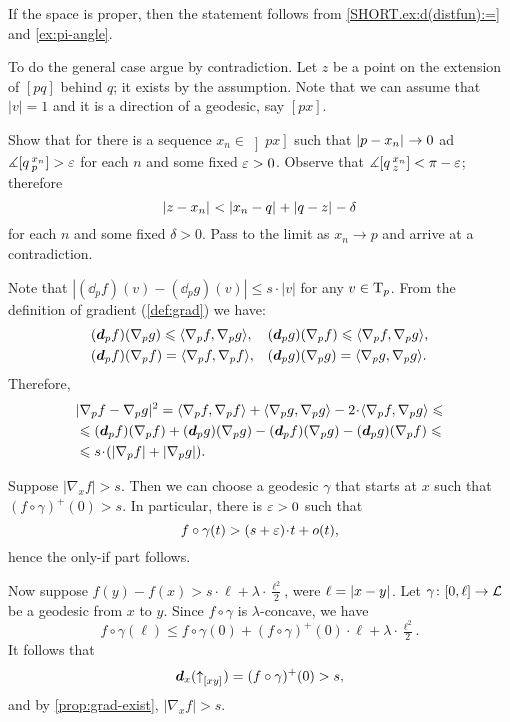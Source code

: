 If the space is proper, then the statement follows from \ref{SHORT.ex:d(distfun):=} and \ref{ex:pi-angle}.

To do the general case argue by contradiction.
Let $z$ be a point on the extension of $[pq]$ behind $q$;
it exists by the assumption.
Note that we can assume that $|v|=1$ and it is a direction of a geodesic, say $[px]$.

Show that for there is a sequence $x_n\in \left]px\right]$ such that $|{p}-{x_n}|_{}^{{}}\to0$ ad
$\measuredangle [q\,{}^{x_n}_{p}]>\varepsilon$ for each $n$ and some fixed $\varepsilon>0$.
Observe that $\measuredangle[q\,{}^{x_n}_{z}]<\pi-\varepsilon$; therefore
\[\dist{z}{x_n}{}<\dist{x_n}{q}{}+\dist{q}z{}-\delta\]
for each $n$ and some fixed $\delta>0$.
Pass to the limit as $x_n\to p$ and arrive at a contradiction.

Note that
$|(\dd_p f)(v)-(\dd_p g)(v)|\le s\cdot|v|$
for any $v\in \mathrm{T}_p$.
From the definition of gradient (\ref{def:grad}) we have:
\begin{align*}
&(\bm{d}_p f)(\nabla_p g)\leqslant\langle\nabla_p f,\nabla_p g\rangle,
&&(\bm{d}_p g)(\nabla_p f)\leqslant\langle\nabla_p f,\nabla_p g\rangle,
\\
&(\bm{d}_p f)(\nabla_p f)=\langle\nabla_p f,\nabla_p f\rangle,
&&(\bm{d}_p g)(\nabla_p g)=\langle\nabla_p g,\nabla_p g\rangle.
\end{align*}
Therefore,
\begin{align*}
&\dist[2]{\nabla_pf}{\nabla_pg}{}
=\<\nabla_p f,\nabla_p f\>+\<\nabla_p g,\nabla_p g\>-2\cdot\<\nabla_p f,\nabla_p g\>
\le
\\
&\le (\dd_p f)(\nabla_p f)+(\dd_p g)(\nabla_p g)-
(\dd_p f)(\nabla_p g)-(\dd_p g)(\nabla_p f)
\le
\\
&\le s\cdot(|\nabla_p f|+|\nabla_p g|).
\end{align*}

Suppose $|\nabla_xf|> s$.
Then we can choose a geodesic $\gamma$ that starts at $x$ such that 
$(f\circ\gamma)^+(0)>s$.
In particular, there is $\varepsilon>0$ such that
\[f\circ\gamma(t)>(s+\eps)\cdot t+o(t),\]
hence the only-if part follows.

Now suppose $f(y)-f(x)>s\cdot \ell+\lambda\cdot \tfrac{\ell^2}2$,
were $\ell=|{x}-{y}|_{}^{{}}$.
Let $\gamma\colon[0,\ell]\to \mathcal{L}$ be a geodesic from $x$ to $y$.
Since $f\circ\gamma$ is $\lambda$-concave, we have
\[f\circ\gamma(\ell)\le f\circ\gamma(0)+(f\circ\gamma)^+(0)\cdot\ell+\lambda\cdot \tfrac{\ell^2}2.\]
It follows that 
\[\bm{d}_x({\uparrow}_{[{x}{y}]_{{}}})=(f\circ\gamma)^+(0)>s,\]
and by \ref{prop:grad-exist}, $|\nabla_x f|>s$.

